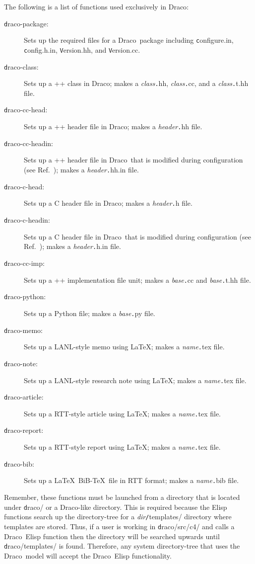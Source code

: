 \documentclass[11pt]{nmemo}
\newcommand{\comp}[1]{{\normalfont\texttt#1}}
\newcommand{\draco}{{\normalfont\sffamily Draco}}
\begin{document}
The following is a list of functions used exclusively in \draco:
\begin{description}
\item[\comp{draco-package}:] Sets up the required files for a \draco\ 
  package including \comp{configure.in}, \comp{config.h.in},
  \comp{Version.hh}, and \comp{Version.cc}.
\item[\comp{draco-class}:] Sets up a \C++ class in \draco; makes a
  \textsl{class}\comp{.hh}, \textsl{class}\comp{.cc}, and a
  \textsl{class}\comp{.t.hh} file.
\item[\comp{draco-cc-head}:] Sets up a \C++ header file in \draco;
  makes a \textsl{header}\comp{.hh} file.
\item[\comp{draco-cc-headin}:] Sets up a \C++ header file in \draco\ 
  that is modified during configuration (see Ref.~\cite{draco-build});
  makes a \textsl{header}\comp{.hh.in} file.
\item[\comp{draco-c-head}:] Sets up a C header file in \draco; makes a 
  \textsl{header}\comp{.h} file.
\item[\comp{draco-c-headin}:] Sets up a C header file in \draco\ that
  is modified during configuration (see Ref.~\cite{draco-build});
  makes a \textsl{header}\comp{.h.in} file.
\item[\comp{draco-cc-imp}:] Sets up a \C++ implementation file unit;
  makes a \textsl{base}\comp{.cc} and \textsl{base}\comp{.t.hh} file.
\item[\comp{draco-python}:] Sets up a Python file; makes a
  \textsl{base}\comp{.py} file.
\item[\comp{draco-memo}:] Sets up a LANL-style memo using \LaTeX;
  makes a \textsl{name}\comp{.tex} file.
\item[\comp{draco-note}:] Sets up a LANL-style research note using
  \LaTeX; makes a \textsl{name}\comp{.tex} file.
\item[\comp{draco-article}:] Sets up a RTT-style article using \LaTeX;
  makes a \textsl{name}\comp{.tex} file.
\item[\comp{draco-report}:] Sets up a RTT-style report using \LaTeX;
  makes a \textsl{name}\comp{.tex} file.
\item[\comp{draco-bib}:] Sets up a \LaTeX\ BiB-\TeX\ file in RTT
  format; makes a \textsl{name}\comp{.bib} file.
\end{description}

Remember, these functions must be launched from a directory that is
located under \comp{draco/} or a \draco-like directory.  This is
required because the Elisp functions search up the directory-tree for
a \textsl{dir}\comp{/templates/} directory where templates are stored.
Thus, if a user is working in \comp{draco/src/c4/} and calls a \draco\ 
Elisp function then the directory will be searched upwards until
\comp{draco/templates/} is found.  Therefore, any system
directory-tree that uses the \draco\ model will accept the \draco\ 
Elisp functionality.
\end{document}
